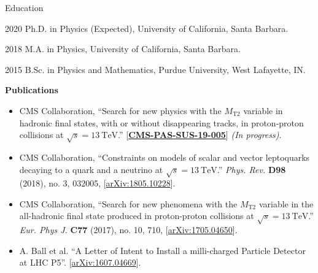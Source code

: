 \begin{vitae}

\begin{vitaesection}{Education}
\vspace{-0.1cm}
\item [2020] Ph.D. in Physics (Expected), University of California, Santa Barbara.
\item [2018] M.A. in Physics, University of California, Santa Barbara.
\item [2015] B.Sc. in Physics and Mathematics, Purdue University, West Lafayette, IN.
\end{vitaesection}

\vspace{0.5cm}
\textbf{Publications}


\begin{itemize}

\item CMS Collaboration, ``Search for new physics with the $M_\mathrm{T2}$ variable in hadronic
  final states, with or without disappearing tracks, in proton-proton collisions at $\sqrt{s}=13~\mathrm{TeV}$.''
  [\href{http://inspirehep.net/record/1726176/}{\bf CMS-PAS-SUS-19-005}] \textit{(In progress)}.

\item CMS Collaboration, ``Constraints on models of scalar and vector leptoquarks decaying to a quark
  and a neutrino at $\sqrt{s}=13~\mathrm{TeV}$.'' \textit{Phys. Rev.}
  \textbf{D98} (2018), no. 3, 032005, [\href{https://arxiv.org/abs/1805.10228}{arXiv:1805.10228}].

\item CMS Collaboration, ``Search for new phenomena with the $M_\mathrm{T2}$ variable in the all-hadronic
  final state produced in proton-proton collisions at $\sqrt{s}=13~\mathrm{TeV}$.'' \textit{Eur. Phys J.}
  \textbf{C77} (2017), no. 10, 710, [\href{https://arxiv.org/abs/1705.04650}{arXiv:1705.04650}].

\item A. Ball et al. ``A Letter of Intent to Install a milli-charged Particle Detector at LHC P5''.
  [\href{https://arxiv.org/abs/1607.04669}{arXiv:1607.04669}].

\end{itemize}

\end{vitae}
